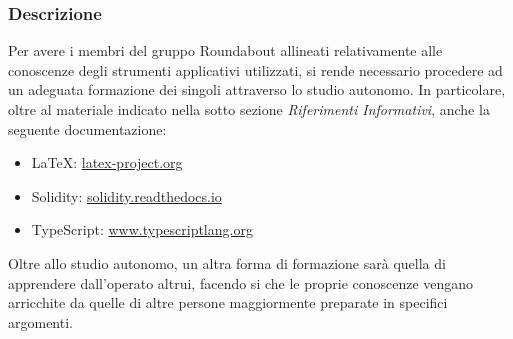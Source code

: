 		\subsubsection{Descrizione}		
		Per avere i membri del gruppo Roundabout allineati relativamente alle conoscenze degli strumenti applicativi utilizzati, si rende necessario procedere ad un adeguata formazione dei singoli attraverso lo studio autonomo. In particolare, oltre al materiale indicato nella sotto sezione \textit{Riferimenti Informativi}, anche la seguente documentazione:
		\begin{itemize}
			\item \LaTeX{}: \href{latex-project.org}{latex-project.org}
			\item Solidity: \href{solidity.readthedocs.io}{solidity.readthedocs.io}
			\item TypeScript: \href{www.typescriptlang.org}{www.typescriptlang.org}
		\end{itemize}
		Oltre allo studio autonomo, un altra forma di formazione sarà quella di apprendere dall'operato altrui, facendo si che le proprie conoscenze vengano arricchite da quelle di altre persone maggiormente preparate in specifici argomenti.
